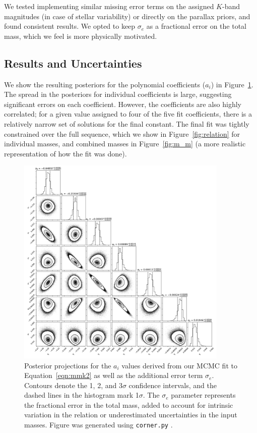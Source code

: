 \documentclass[twocolumn]{aastex62}
\begin{document}
We tested implementing similar missing error terms on the assigned $K$-band magnitudes (in case of stellar variability) or directly on the parallax priors, and found consistent results. We opted to keep $\sigma_e$ as a fractional error on the total mass, which we feel is more physically motivated.

\subsection{Results and Uncertainties}\label{sec:res}

We show the resulting posteriors for the polynomial coefficients ($a_i$) in Figure~\ref{fig:fitpost}. The spread in the posteriors for individual coefficients is large, suggesting significant errors on each coefficient. However, the coefficients are also highly correlated; for a given value assigned to four of the five fit coefficients, there is a relatively narrow set of solutions for the final constant. The final fit was tightly constrained over the full sequence, which we show in Figure~\ref{fig:relation} for individual masses, and combined masses in Figure~\ref{fig:m_m} (a more realistic representation of how the fit was done). 

\begin{figure}[p]
\begin{center}
\includegraphics[width=0.9\textwidth]{output_7_eMs.pdf}
\caption{Posterior projections for the $a_i$ values derived from our MCMC fit to Equation~\ref{eqn:mmk2} as well as the additional error term $\sigma_e$. Contours denote the 1, 2, and 3$\sigma$ confidence intervals, and the dashed lines in the histogram mark 1$\sigma$. The $\sigma_e$ parameter represents the fractional error in the total mass, added to account for intrinsic variation in the relation or underestimated uncertainties in the input masses. Figure was generated using {\tt corner.py} \citep{corner}.}
\label{fig:fitpost}
\end{center}
\end{figure}
\end{document}
